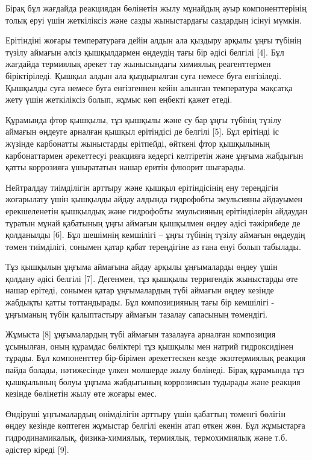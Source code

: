 \begin{multicols}{2}
Бірақ бұл жағдайда реакциядан бөлінетін жылу мұнайдың ауыр
компоненттерінің толық еруі үшін жеткіліксіз және сазды жыныстардағы
саздардың ісінуі мүмкін.

Ерітіндіні жоғары температураға дейін алдын ала қыздыру арқылы ұңғы
түбінің түзілу аймағын әлсіз қышқылдармен өңдеудің тағы бір әдісі
белгілі {[}4{]}. Бұл жағдайда термиялық әрекет тау жынысындағы химиялық
реагенттермен біріктіріледі. Қышқыл алдын ала қыздырылған суға немесе
буға енгізіледі. Қышқылды суға немесе буға енгізгеннен кейін алынған
температура мақсатқа жету үшін жеткіліксіз болып, жұмыс көп еңбекті
қажет етеді.

Құрамында фтор қышқылы, тұз қышқылы және су бар ұңғы түбінің түзілу
аймағын өңдеуге арналған қышқыл ерітіндісі де белгілі {[}5{]}. Бұл
ерітінді іс жүзінде карбонатты жыныстарды ерітпейді, өйткені фтор
қышқылының карбонаттармен әрекеттесуі реакцияға кедергі келтіретін және
ұңғыма жабдығын қатты коррозияға ұшырататын нашар еритін флюорит
шығарады.

Нейтралдау тиімділігін арттыру және қышқыл ерітіндісінің ену тереңдігін
жоғарылату үшін қышқылды айдау алдында гидрофобты эмульсияны айдауымен
ерекшеленетін қышқылдық және гидрофобты эмульсияның ерітінділерін
айдаудан тұратын мұнай қабатының ұңғы аймағын қышқылмен өңдеу әдісі
тәжірибеде де қолданылды {[}6{]}. Бұл шешімнің кемшілігі -- ұңғы түбінің
түзілу аймағын өңдеудің төмен тиімділігі, сонымен қатар қабат
тереңдігіне аз ғана енуі болып табылады.

Тұз қышқылын ұңғыма аймағына айдау арқылы ұңғымаларды өңдеу үшін қолдану
әдісі белгілі {[}7{]}. Дегенмен, тұз қышқылы терригендік жыныстарды өте
нашар ерітеді, сонымен қатар ұңғымалардың түбі аймағын өңдеу кезінде
жабдықты қатты тоттандырады. Бұл композицияның тағы бір кемшілігі -
ұңғыманың түбін қалыптастыру аймағын тазалау сапасының төмендігі.

Жұмыста {[}8{]} ұңғымалардың түбі аймағын тазалауға арналған композиция
ұсынылған, оның құрамдас бөліктері тұз қышқылы мен натрий гидроксидінен
тұрады. Бұл компоненттер бір-бірімен әрекеттескен кезде экзотермиялық
реакция пайда болады, нәтижесінде үлкен мөлшерде жылу бөлінеді. Бірақ
құрамында тұз қышқылының болуы ұңғыма жабдығының коррозиясын тудырады
және реакция кезінде бөлінетін жылу өте жоғары емес.

Өндіруші ұңғымалардың өнімділігін арттыру үшін қабаттың төменгі бөлігін
өңдеу кезінде көптеген жұмыстар белгілі екенін атап өткен жөн. Бұл
жұмыстарға гидродинамикалық, физика-химиялық, термиялық, термохимиялық
және т.б. әдістер кіреді {[}9{]}.


\end{multicols}
